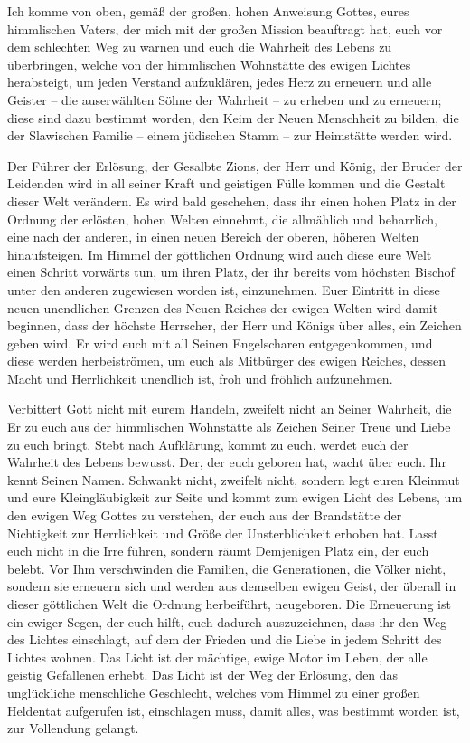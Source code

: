 Ich komme von oben, gemäß der großen, hohen Anweisung Gottes, eures himmlischen Vaters, der mich mit der großen Mission beauftragt hat, euch vor dem schlechten Weg zu warnen und euch die Wahrheit des Lebens zu überbringen, welche von der himmlischen Wohnstätte des ewigen Lichtes herabsteigt, um jeden Verstand aufzuklären, jedes Herz zu erneuern und alle Geister -- die auserwählten Söhne der Wahrheit -- zu erheben und zu erneuern; diese sind dazu bestimmt worden, den Keim der Neuen Menschheit zu bilden, die der Slawischen Familie -- einem jüdischen Stamm -- zur Heimstätte werden wird.

Der Führer der Erlösung, der Gesalbte Zions, der Herr und König, der Bruder der Leidenden wird in all seiner Kraft und geistigen Fülle kommen und die Gestalt dieser Welt verändern. Es wird bald geschehen, dass ihr einen hohen Platz in der Ordnung der erlösten, hohen Welten einnehmt, die allmählich und beharrlich, eine nach der anderen, in einen neuen Bereich der oberen, höheren Welten hinaufsteigen. Im Himmel der göttlichen Ordnung wird auch diese eure Welt einen Schritt vorwärts tun, um ihren Platz, der ihr bereits vom höchsten Bischof unter den anderen zugewiesen worden ist, einzunehmen. Euer Eintritt in diese neuen unendlichen Grenzen des Neuen Reiches der ewigen Welten wird damit beginnen, dass der höchste Herrscher, der Herr und Königs über alles, ein Zeichen geben wird. Er wird euch mit all Seinen Engelscharen entgegenkommen, und diese werden herbeiströmen, um euch als Mitbürger des ewigen Reiches, dessen Macht und Herrlichkeit unendlich ist, froh und fröhlich aufzunehmen. 

Verbittert Gott nicht mit eurem Handeln, zweifelt nicht an Seiner Wahrheit, die Er zu euch aus der himmlischen Wohnstätte als Zeichen Seiner Treue und Liebe zu euch bringt. Stebt nach Aufklärung, kommt zu euch, werdet euch der Wahrheit des Lebens bewusst. Der, der euch geboren hat, wacht über euch. Ihr kennt Seinen Namen. Schwankt nicht, zweifelt nicht, sondern legt euren Kleinmut und eure Kleingläubigkeit zur Seite und kommt zum ewigen Licht des Lebens, um den ewigen Weg Gottes zu verstehen, der euch aus der Brandstätte der Nichtigkeit zur Herrlichkeit und Größe der Unsterblichkeit erhoben hat. 
Lasst euch nicht in die Irre führen, sondern räumt Demjenigen Platz ein, der euch belebt. Vor Ihm verschwinden die Familien, die Generationen, die Völker nicht, sondern sie erneuern sich und werden aus demselben ewigen Geist, der überall in dieser göttlichen Welt die Ordnung herbeiführt, neugeboren. Die Erneuerung ist ein ewiger Segen, der euch hilft, euch dadurch auszuzeichnen, dass ihr den Weg des Lichtes einschlagt, auf dem der Frieden und die Liebe in jedem Schritt des Lichtes wohnen. Das Licht ist der mächtige, ewige Motor im Leben, der alle geistig Gefallenen erhebt. Das Licht ist der Weg der Erlösung, den das unglückliche menschliche Geschlecht, welches vom Himmel zu einer großen Heldentat aufgerufen ist, einschlagen muss, damit alles, was bestimmt worden ist, zur Vollendung gelangt.

